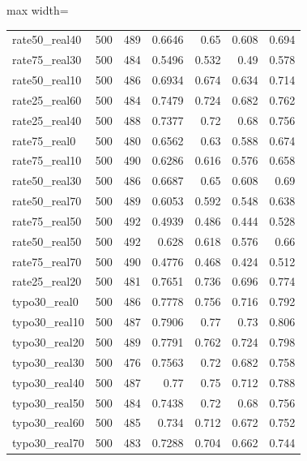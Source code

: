 \documentclass[11pt]{article}
\begin{document}
\begin{table}[H]
\begin{adjustbox}{max width=\textwidth}
\begin{tabular}{lrrrrrr}
rate50\_real40 & 500 & 489 & 0.6646 & 0.65 & 0.608 & 0.694 \\
rate75\_real30 & 500 & 484 & 0.5496 & 0.532 & 0.49 & 0.578 \\
rate50\_real10 & 500 & 486 & 0.6934 & 0.674 & 0.634 & 0.714 \\
rate25\_real60 & 500 & 484 & 0.7479 & 0.724 & 0.682 & 0.762 \\
rate25\_real40 & 500 & 488 & 0.7377 & 0.72 & 0.68 & 0.756 \\
rate75\_real0 & 500 & 480 & 0.6562 & 0.63 & 0.588 & 0.674 \\
rate75\_real10 & 500 & 490 & 0.6286 & 0.616 & 0.576 & 0.658 \\
rate50\_real30 & 500 & 486 & 0.6687 & 0.65 & 0.608 & 0.69 \\
rate50\_real70 & 500 & 489 & 0.6053 & 0.592 & 0.548 & 0.638 \\
rate75\_real50 & 500 & 492 & 0.4939 & 0.486 & 0.444 & 0.528 \\
rate50\_real50 & 500 & 492 & 0.628 & 0.618 & 0.576 & 0.66 \\
rate75\_real70 & 500 & 490 & 0.4776 & 0.468 & 0.424 & 0.512 \\
rate25\_real20 & 500 & 481 & 0.7651 & 0.736 & 0.696 & 0.774 \\
typo30\_real0 & 500 & 486 & 0.7778 & 0.756 & 0.716 & 0.792 \\
typo30\_real10 & 500 & 487 & 0.7906 & 0.77 & 0.73 & 0.806 \\
typo30\_real20 & 500 & 489 & 0.7791 & 0.762 & 0.724 & 0.798 \\
typo30\_real30 & 500 & 476 & 0.7563 & 0.72 & 0.682 & 0.758 \\
typo30\_real40 & 500 & 487 & 0.77 & 0.75 & 0.712 & 0.788 \\
typo30\_real50 & 500 & 484 & 0.7438 & 0.72 & 0.68 & 0.756 \\
typo30\_real60 & 500 & 485 & 0.734 & 0.712 & 0.672 & 0.752 \\
typo30\_real70 & 500 & 483 & 0.7288 & 0.704 & 0.662 & 0.744 \\
\bottomrule
\end{tabular}
\end{adjustbox}
\end{table}
\end{document}
